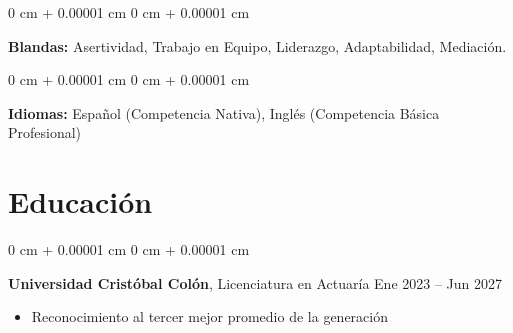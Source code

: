 \documentclass[10pt, letterpaper]{article}
\newenvironment{highlights}{
    \begin{itemize}[
        topsep=0.10 cm,
        parsep=0.10 cm,
        partopsep=0pt,
        itemsep=0pt,
        leftmargin=0 cm + 10pt
    ]
}{
    \end{itemize}
} %
\newenvironment{onecolentry}{
    \begin{adjustwidth}{
        0 cm + 0.00001 cm
    }{
        0 cm + 0.00001 cm
    }
}{
    \end{adjustwidth}
} %
\newenvironment{twocolentry}[2][]{
    \onecolentry
    \def\secondColumn{#2}
    \setcolumnwidth{\fill, 4.5 cm}
    \begin{paracol}{2}
}{
    \switchcolumn \raggedleft \secondColumn
    \end{paracol}
    \endonecolentry
} %
\begin{document}
        \vspace{0.2 cm}

        \begin{onecolentry}
            \textbf{Blandas:} Asertividad, Trabajo en Equipo, Liderazgo, Adaptabilidad, Mediación.
        \end{onecolentry}

        \vspace{0.2 cm}

        \begin{onecolentry}
            \textbf{Idiomas:} Español (Competencia Nativa), Inglés (Competencia Básica Profesional)
        \end{onecolentry}

        


    \section{Educación}
        
        \begin{twocolentry}{
            Ene 2023 – Jun 2027
        }
            \textbf{Universidad Cristóbal Colón}, Licenciatura en Actuaría\end{twocolentry}
                \begin{highlights}
                    \item Reconocimiento al tercer mejor promedio de la generación
                \end{highlights}    
        \vspace{0.10 cm}
\end{document}

